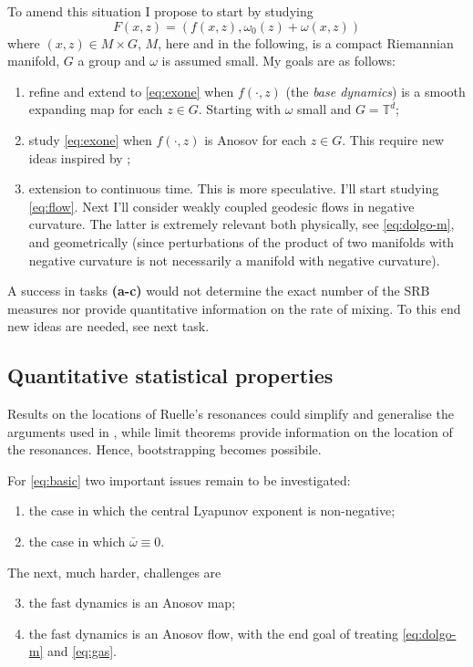 \documentclass[10pt, a4paper, reqno]{amsart}
\newcommand\bT{{\mathbb T}}
\begin{document}
To amend this situation I propose to start by studying
\begin{equation}\label{eq:exone}
F(x,z)=(f(x,z), \omega_0(z)+\omega(x,z))
\end{equation}
where $(x,z)\in M\times G$, $M$, here and in the following, is a compact Riemannian manifold, $G$ a group and $\omega$ is assumed small. My goals are as follows:
\begin{enumerate}
\item refine and extend \cite{CL21} to \eqref{eq:exone} when $f(\cdot,z)$ (the {\em base dynamics}) is a smooth expanding map for each $z\in G$. Starting with $\omega$ small and $G=\bT^d$;
\item study \eqref{eq:exone} when $f(\cdot, z)$ is Anosov for each $z\in G$. This require new ideas inspired by \cite{GL06, BT07}; 
\item extension to continuous time. This is more speculative. I'll start studying \eqref{eq:flow}.
Next I'll consider weakly coupled geodesic flows in negative curvature. The latter is extremely relevant both physically, see \eqref{eq:dolgo-m}, and geometrically (since perturbations of the product of two manifolds with negative curvature is not necessarily a manifold with negative curvature).
\end{enumerate}

A success in tasks {\bf \color{hyColor} (a-c)} would not determine the exact number of the SRB measures nor provide quantitative information on the rate of mixing. To this end new ideas are needed, see next task.

\subsection{Quantitative statistical properties}\label{sec:2stat}
Results on the locations of Ruelle's resonances could simplify and generalise the arguments used in \cite{DL16, DL18,DeLPVb}, while limit theorems provide information on the location of the resonances. Hence, bootstrapping becomes possibile. 

For \eqref{eq:basic} two important issues remain to be investigated:
\begin{enumerate}
\item the case in which the central Lyapunov exponent is non-negative;
\item the case in which $\bar \omega\equiv 0$.
\end{enumerate}
The next, much harder, challenges are
\begin{enumerate}
\setcounter{enumi}{2}
\item the fast dynamics is an Anosov map;
\item the fast dynamics is an Anosov flow, with the end goal of treating \eqref{eq:dolgo-m} and \eqref{eq:gas}.
\end{enumerate}
\end{document}
